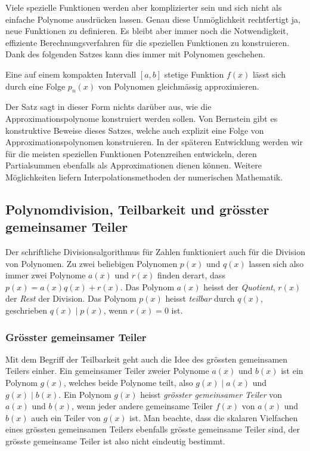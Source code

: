 Viele spezielle Funktionen werden aber komplizierter sein und
sich nicht als einfache Polynome ausdrücken lassen.
Genau diese Unmöglichkeit rechtfertigt ja, neue Funktionen
zu definieren.
Es bleibt aber immer noch die Notwendigkeit, effiziente 
Berechnungsverfahren für die speziellen Funktionen zu konstruieren.
Dank des folgenden Satzes kann dies immer mit Polynomen geschehen.

\begin{satz}[Weierstrass]
\label{buch:potenzen:satz:weierstrass}
%
Eine auf einem kompakten Intervall $[a,b]$ stetige Funktion $f(x)$
lässt sich durch eine Folge $p_n(x)$ von Polynomen gleichmässig
approximieren.
\end{satz}

Der Satz sagt in dieser Form nichts darüber aus, wie die
Approximationspolynome konstruiert werden sollen.
Von Bernstein gibt es konstruktive Beweise dieses Satzes,
welche auch explizit eine Folge von Approximationspolynomen
konstruieren.
In der späteren Entwicklung werden wir für die meisten
speziellen Funktionen Potenzreihen entwickeln, deren Partialsummen
ebenfalls als Approximationen dienen können.
Weitere Möglichkeiten liefern Interpolationsmethoden der
numerischen Mathematik.

%
%
\subsection{Polynomdivision, Teilbarkeit und grösster gemeinsamer Teiler}
Der schriftliche Divisionsalgorithmus für Zahlen funktioniert 
auch für die Division von Polynomen.
%
Zu zwei beliebigen Polynomen $p(x)$ und $q(x)$ lassen sich also
immer zwei Polynome $a(x)$ und $r(x)$ finden derart, dass
$p(x) = a(x) q(x) + r(x)$.
Das Polynom $a(x)$ heisst der {\em Quotient}, $r(x)$ der {\em Rest}
der Division.
Das Polynom $p(x)$ heisst {\em teilbar} durch $q(x)$, geschrieben
%
%
$q(x)\mid p(x)$, wenn $r(x)=0$ ist.

%
%
\subsubsection{Grösster gemeinsamer Teiler}
Mit dem Begriff der Teilbarkeit geht auch die Idee des grössten
gemeinsamen Teilers einher.
Ein gemeinsamer Teiler zweier Polynome $a(x)$ und $b(x)$ 
%
ist ein Polynom $g(x)$, welches beide Polynome teilt, also
$g(x)\mid a(x)$ und $g(x)\mid b(x)$.
%
Ein Polynom $g(x)$ heisst {\em grösster gemeinsamer Teiler} von $a(x)$
und $b(x)$, wenn jeder andere gemeinsame Teiler $f(x)$ von $a(x)$
und $b(x)$ auch ein Teiler von $g(x)$ ist.
Man beachte, dass die skalaren Vielfachen eines grössten gemeinsamen
Teilers ebenfalls grösste gemeinsame Teiler sind, der grösste gemeinsame
Teiler ist also nicht eindeutig bestimmt.

